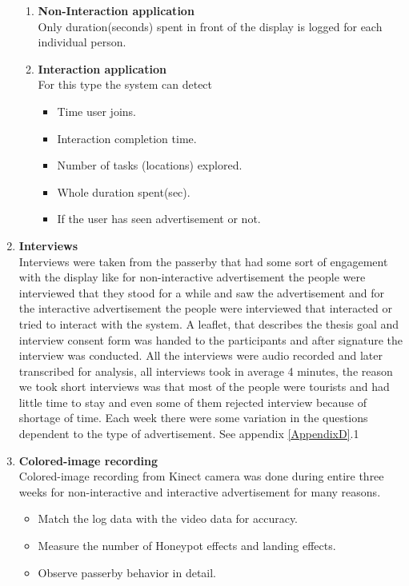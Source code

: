 \begin{enumerate}
\begin{enumerate}
\item	\textbf{Non-Interaction application} \\
Only duration(seconds) spent in front of the display is logged for each individual person.

\item	\textbf{Interaction application}\\
For this type the system can detect

\begin{itemize}
\item	Time user joins.
\item	Interaction completion time.
\item	Number of tasks (locations) explored.
\item	Whole duration spent(sec).
\item	If the user has seen advertisement or not.
\end{itemize}

\end{enumerate}

\item \textbf{Interviews} \\
Interviews were taken from the passerby that had some sort of engagement with the display like for non-interactive advertisement the people were interviewed that they stood for a while and saw the advertisement and for the interactive advertisement the people were interviewed that interacted or tried to interact with the system.
A leaflet, that describes the thesis goal and interview consent form was handed to the participants and after signature the interview was conducted. All the interviews were audio recorded and later transcribed for analysis, all interviews took in average 4 minutes, the reason we took short interviews was that most of the people were tourists and had little time to stay and even some of them rejected interview because of shortage of time.
Each week there were some variation in the questions dependent to the type of advertisement.  See appendix \ref{AppendixD}.1


\item \textbf{Colored-image recording} \\
Colored-image recording from Kinect camera was done during entire three weeks for non-interactive and interactive advertisement for many reasons.

\begin{itemize}
\item Match the log data with the video data for accuracy.
\item Measure the number of Honeypot effects and landing effects.
\item Observe passerby behavior in detail.
\end{itemize}


\end{enumerate}
